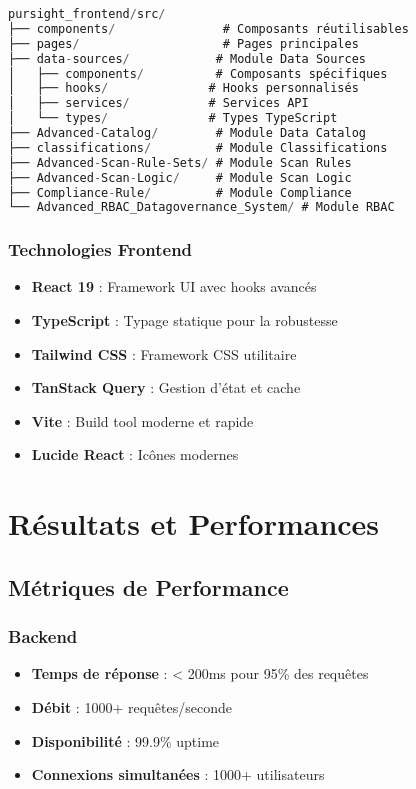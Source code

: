 \documentclass[12pt,a4paper]{article}
\begin{document}
\begin{lstlisting}[language=JavaScript, caption=Structure du frontend]
pursight_frontend/src/
├── components/               # Composants réutilisables
├── pages/                    # Pages principales
├── data-sources/            # Module Data Sources
│   ├── components/          # Composants spécifiques
│   ├── hooks/              # Hooks personnalisés
│   ├── services/           # Services API
│   └── types/              # Types TypeScript
├── Advanced-Catalog/        # Module Data Catalog
├── classifications/         # Module Classifications
├── Advanced-Scan-Rule-Sets/ # Module Scan Rules
├── Advanced-Scan-Logic/     # Module Scan Logic
├── Compliance-Rule/         # Module Compliance
└── Advanced_RBAC_Datagovernance_System/ # Module RBAC
\end{lstlisting}

\subsubsection{Technologies Frontend}

\begin{itemize}
    \item \textbf{React 19} : Framework UI avec hooks avancés
    \item \textbf{TypeScript} : Typage statique pour la robustesse
    \item \textbf{Tailwind CSS} : Framework CSS utilitaire
    \item \textbf{TanStack Query} : Gestion d'état et cache
    \item \textbf{Vite} : Build tool moderne et rapide
    \item \textbf{Lucide React} : Icônes modernes
\end{itemize}

\section{Résultats et Performances}

\subsection{Métriques de Performance}

\subsubsection{Backend}
\begin{itemize}
    \item \textbf{Temps de réponse} : < 200ms pour 95\% des requêtes
    \item \textbf{Débit} : 1000+ requêtes/seconde
    \item \textbf{Disponibilité} : 99.9\% uptime
    \item \textbf{Connexions simultanées} : 1000+ utilisateurs
\end{itemize}
\end{document}
